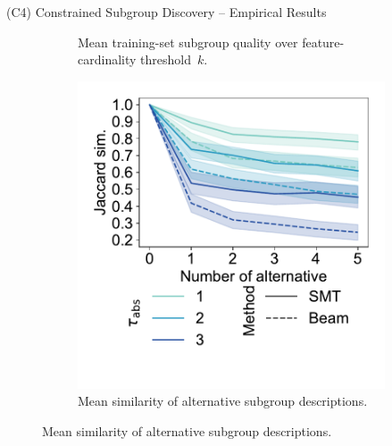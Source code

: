\documentclass[en, navbarinline, handout]{sdqbeamer}
\begin{document}
\begin{frame}[t]{(C4) Constrained Subgroup Discovery -- Empirical Results}
\begin{figure}
\begin{subfigure}[t]{0.32\textwidth}
			\caption*{Mean training-set subgroup quality over feature-cardinality threshold~$k$.}
		\end{subfigure}
		\hfill
		\pause
		\begin{subfigure}[t]{0.32\textwidth}
			\centering
			\includegraphics[width=\textwidth, trim={15 50 15 18}, clip]{plots/csd-alternatives-jaccard.pdf}
			\caption*{Mean similarity of alternative subgroup descriptions.}
		\end{subfigure}
	\end{figure}
\end{frame}
\end{document}
